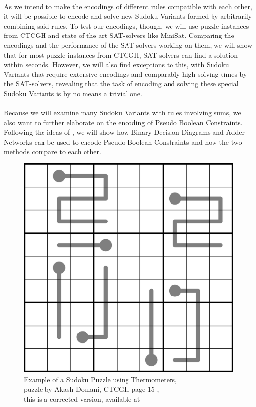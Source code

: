\\
As we intend to make the encodings of different rules compatible with each other, it will be possible to encode and solve new Sudoku Variants formed by arbitrarily combining said rules. To test our encodings, though, we will use puzzle instances from CTCGH and state of the art SAT-solvers like MiniSat. Comparing the encodings and the performance of the SAT-solvers working on them, we will show that for most puzzle instances from CTCGH, SAT-solvers can find a solution within seconds. However, we will also find exceptions to this, with Sudoku Variants that require extensive encodings and comparably high solving times by the SAT-solvers, revealing that the task of encoding and solving these special Sudoku Variants is by no means a trivial one.\\
\\
Because we will examine many Sudoku Variants with rules involving sums, we also want to further elaborate on the encoding of Pseudo Boolean Constraints. Following the ideas of \cite{Een2006TranslatingPC}, we will show how Binary Decision Diagrams and Adder Networks can be used to encode Pseudo Boolean Constraints and how the two methods compare to each other.

\begin{figure}
\centering
\captionsetup{justification=centering,margin=0cm}
\includegraphics[width=\textwidth]{Figures/Thermo2020.png}
\caption{Example of a Sudoku Puzzle using Thermometers,\\puzzle by Akash Doulani, CTCGH page 15 \cite{CrackingTheCryptic2021},\\this is a corrected version, available at \cite{OnlineSolutionThermo2020} }
\label{fig:Thermo2020}
\end{figure}





